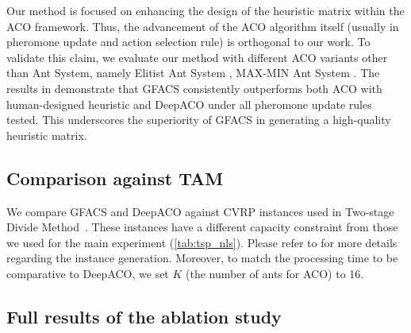 \documentclass[twoside]{article}
\theoremstyle{plain}
\theoremstyle{definition}
\theoremstyle{remark}
\begin{document}
Our method is focused on enhancing the design of the heuristic matrix within the ACO framework. Thus, the advancement of the ACO algorithm itself (usually in pheromone update and action selection rule) is orthogonal to our work.
To validate this claim, we evaluate our method with different ACO variants other than Ant System, namely Elitist Ant System \citep{ant-sys}, MAX-MIN Ant System \citep{max-min-ant}.
The results in  demonstrate that GFACS consistently outperforms both ACO with human-designed heuristic and DeepACO under all pheromone update rules tested. This underscores the superiority of GFACS in generating a high-quality heuristic matrix.

\subsection{Comparison against TAM} \label{app:tam}

\begin{table}[ht]
    \centering
    \caption{Results for CVRP instances used in TAM. The results for AM and TAM is drawn from \citet{hou2022generalize}, and the result for DeepACO is drawn from \citet{ye2023deepaco}.}
    \vspace{-5pt}
    \resizebox{0.5\linewidth}{!}{}
    \label{tab:tam}
\end{table}

We compare GFACS and DeepACO against CVRP instances used in Two-stage Divide Method~\citep[TAM;][]{hou2022generalize}. These instances have a different capacity constraint from those we used for the main experiment (\cref{tab:tsp_nls}). Please refer to \cite{hou2022generalize} for more details regarding the instance generation. Moreover, to match the processing time to be comparative to DeepACO, we set $K$ (the number of ants for ACO) to 16.


\subsection{Full results of the ablation study}
\label{app:ablation}

\begin{table}[ht]
    \centering
    \caption{Results of the ablation study. The mean and standard deviation are reported based on three independent runs. The reported gap is calculated against Concorde \citep{concorde} for TSP and PyVRP \citep{Wouda_Lan_Kool_PyVRP_2024} for CVRP.}
    \vspace{-5pt}
    \resizebox{0.95\linewidth}{!}{}
    \label{tab:ablation_full}
\end{table}
\end{document}
